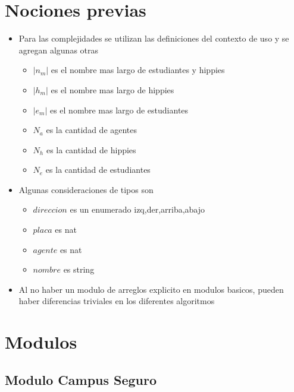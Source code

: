 \documentclass[a4paper,10pt, nofootinbib]{article}
\begin{document}
\thispagestyle{empty}

\maketitle

\tableofcontents
\newpage


\clearpage
\section{Nociones previas}
\begin{itemize}
\item Para las complejidades se utilizan las definiciones del contexto de uso y se agregan algunas otras
\begin{itemize}
	\item $|n_m|$ es el nombre mas largo de estudiantes y hippies
	\item $|h_m|$ es el nombre mas largo de hippies
	\item $|e_m|$ es el nombre mas largo de estudiantes
	\item $N_a$ es la cantidad de agentes
	\item $N_h$ es la cantidad de hippies
	\item $N_e$ es la cantidad de estudiantes
\end{itemize}
\item Algunas consideraciones de tipos son
\begin{itemize}
	\item $direccion$ es un enumerado {izq,der,arriba,abajo}
	\item $placa$ es nat
	\item $agente$ es nat
	\item $nombre$ es string
\end{itemize}
\item Al no haber un modulo de arreglos explicito en modulos basicos, pueden haber diferencias triviales en los diferentes algoritmos

\end{itemize}

\section{Modulos}
\subsection{Modulo Campus Seguro}

\end{document}
